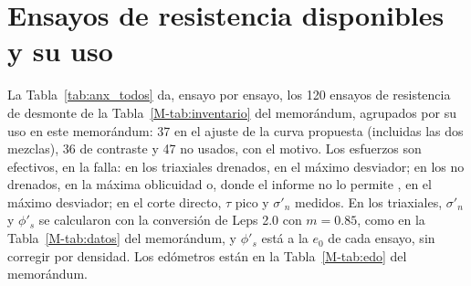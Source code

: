 \documentclass[11pt,letterpaper]{article}
\begin{document}
\appendix
\renewcommand{\thetable}{A\arabic{table}}\setcounter{table}{0}
\section{Ensayos de resistencia disponibles y su uso}\label{sec:anexo}
La Tabla~\ref{tab:anx_todos} da, ensayo por ensayo, los 120 ensayos de resistencia de desmonte de la Tabla~\ref{M-tab:inventario} del memorándum, agrupados por su uso en este memorándum: 37 en el ajuste de la curva propuesta (incluidas las dos mezclas), 36 de contraste y 47 no usados, con el motivo. Los esfuerzos son efectivos, en la falla: en los triaxiales drenados, en el máximo desviador; en los no drenados, en la máxima oblicuidad o, donde el informe no lo permite \citep{g2010}, en el máximo desviador; en el corte directo, $\tau$ pico y $\sigma'_n$ medidos. En los triaxiales, $\sigma'_n$ y $\phi'_s$ se calcularon con la conversión de Leps 2.0 con $m = 0.85$, como en la Tabla~\ref{M-tab:datos} del memorándum, y $\phi'_s$ está a la $e_0$ de cada ensayo, sin corregir por densidad. Los edómetros están en la Tabla~\ref{M-tab:edo} del memorándum.
\end{document}
